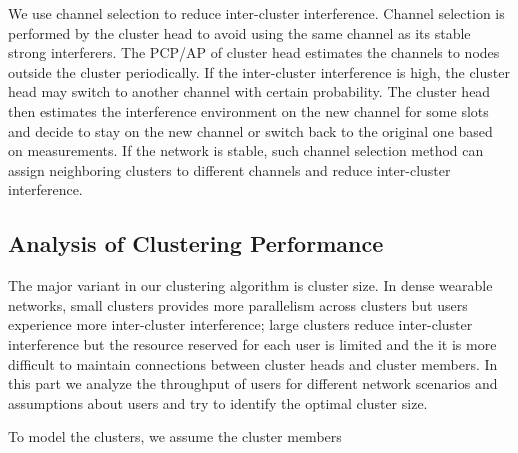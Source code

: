 \documentclass[10pt, conference, letterpaper]{IEEEtran}
\begin{document}
We use channel selection to reduce inter-cluster interference. Channel selection is performed by the cluster head to avoid using the same channel as its stable strong interferers. The PCP/AP of cluster head estimates the channels to nodes outside the cluster periodically. If the inter-cluster interference is high, the cluster head may switch to another channel with certain probability. The cluster head then estimates the interference environment on the new channel for some slots and decide to stay on the new channel or switch back to the original one based on measurements. If the network is stable, such channel selection method can assign neighboring clusters to different channels and reduce inter-cluster interference.


\subsection{Analysis of Clustering Performance}\label{subsection:cluster_analysis}
The major variant in our clustering algorithm is cluster size. In dense wearable networks, small clusters provides more parallelism across clusters but users experience more inter-cluster interference; large clusters reduce inter-cluster interference but the resource reserved for each user is limited and the it is more difficult to maintain connections between cluster heads and cluster members. In this part we analyze the throughput of users for different network scenarios and assumptions about users and try to identify the optimal cluster size.

To model the clusters, we assume the cluster members 
\end{document}
